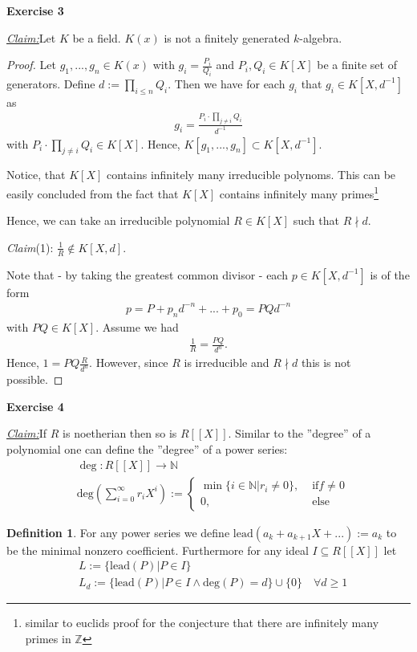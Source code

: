 \documentclass{article}
\newcommand{\N}{\mathbb{N}}
\newcommand{\Z}{\mathbb{Z}}
\newcommand{\lead}{\mathrm{lead}}
\newcommand{\codeg}{\mathrm{deg}}
\newcommand{\inv}[1]{{#1}^{-1}}
\newcommand{\claim}
{\underline{\textit{Claim:}}\hspace{0,2cm}}
\newcommand{\subclaim}[1]
{

	\vspace*{0,2cm}
	\textit{Claim}({#1}):
}
\newcommand{\aufgabe}[1]{
{
	\vspace*{0.5cm}
	\noindent\textsf{\textbf{Exercise #1}}
	\vspace*{0.2cm}

}
}
\theoremstyle{definition}
\newtheorem*{silentdefn}{Definition}
\theoremstyle{plain}
\theoremstyle{remark}
\begin{document}
\aufgabe3 \claim Let $K$ be a field. $K(x)$ is not a finitely generated $k$-algebra.
\begin{proof}
	Let $g_1,...,g_n\in K(x)$ with $g_i = \frac{P_i}{Q_i}$ and $P_i,Q_i\in K[X]$ be a finite set of generators. Define $d := \prod_{i\leq n}Q_i$. Then we have for each $g_i$ that $g_i \in K[X,d^{-1}]$ as 
	\begin{align}
		g_i = \frac{P_i\cdot\prod_{j\neq i}Q_i}{\inv{d}}
	\end{align}
	with $P_i\cdot\prod_{j\neq i}Q_i\in K[X]$. Hence, $K[g_1,...,g_n]\subset K[X,\inv{d}]$. 
	
	Notice, that $K[X]$ contains infinitely many irreducible polynoms. This can be easily concluded from the fact that $K[X]$ contains infinitely many primes\footnote{similar to euclids proof for the conjecture that there are infinitely many primes in $\Z$}

	Hence, we can take an irreducible polynomial $R\in K[X]$ such that $R\nmid d$. 

	\subclaim1 $\frac{1}{R} \notin K[X,d]$.

	Note that - by taking the greatest common divisor - each $p\in K[X,\inv{d}]$ is of the form 
	\begin{align}
		p = P + p_n d^{-n} + ... + p_0 = P Qd^{-n}
	\end{align}
	with $PQ \in K[X]$. 
	Assume we had 
	\begin{align}
		\frac{1}{R} = \frac{PQ}{d^n}.
	\end{align}
	Hence, $1 = PQ \frac{R}{d^n}$. However, since $R$ is irreducible and $R\nmid d$ this is not possible. 

\end{proof}
\aufgabe4
\claim If $R$ is noetherian then so is $R[[X]]$. 
Similar to the ''degree'' of a polynomial one can define the ''degree'' of a power series:
\begin{align}
	&\deg:R[[X]]\rightarrow \N \\
	&\codeg\left(\sum_{i=0}^{\infty}r_iX^i\right):=
	\begin{cases}
		\min\{i\in\N|r_i\neq 0\}, &\text{ if} f\neq 0 \\
		0,			 &\text{ else}
	\end{cases}
\end{align}
\begin{silentdefn}
	For any power series we define $\lead(a_k+a_{k+1}X+...):=a_k$ to be the minimal nonzero coefficient. Furthermore for any ideal $I\subseteq R[[X]]$ let
	\begin{align}
		&L:=\{\lead(P)|P\in I\} \\
		&L_d :=\{\lead(P)|P\in I \wedge \codeg(P)=d\}\cup \{0\} \quad\forall{d\geq 1}
	\end{align}
\end{silentdefn}
\end{document}

